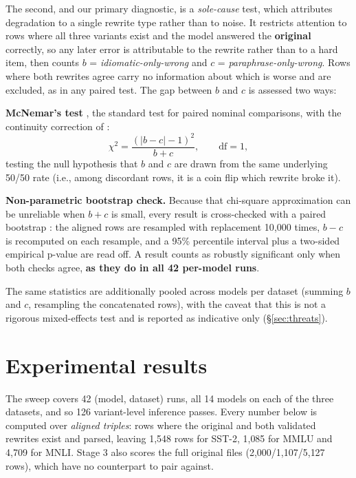 \documentclass{article}   %
\newcommand{\citetf}[1]{\citet{#1}}
\newcommand{\citepf}[1]{\citep{#1}}
\begin{document}
The second, and our primary diagnostic, is a \emph{sole-cause} test, which
attributes degradation to a single rewrite type rather than to noise. It
restricts attention to rows where all three variants exist and the model
answered the \textbf{original} correctly, so any later error is attributable to
the rewrite rather than to a hard item, then counts $b$ =
\emph{idiomatic-only-wrong} and $c$ = \emph{paraphrase-only-wrong}. Rows where
both rewrites agree carry no information about which is worse and are excluded,
as in any paired test. The gap between $b$ and $c$ is assessed two ways:

\textbf{McNemar's test} \citepf{mcnemar1947note}, the standard test for paired
nominal comparisons, with the continuity correction of \citetf{edwards1948note}:
\begin{equation}
  \chi^2 = \frac{(|b - c| - 1)^2}{b + c}, \qquad \mathrm{df} = 1,
\end{equation}
testing the null hypothesis that $b$ and $c$ are drawn from the same
underlying 50/50 rate (i.e., among discordant rows, it is a coin flip which
rewrite broke it).

\textbf{Non-parametric bootstrap check.} Because that chi-square approximation
can be unreliable when $b + c$ is small, every result is cross-checked with a
paired bootstrap \citepf{efron1993bootstrap}: the aligned rows are resampled
with replacement 10{,}000 times, $b - c$ is recomputed on each resample, and a
95\% percentile interval plus a two-sided empirical p-value are read off. A
result counts as robustly significant only when both checks agree, \textbf{as
they do in all 42 per-model runs}.

The same statistics are additionally pooled across models per dataset (summing
$b$ and $c$, resampling the concatenated rows), with the caveat that this is
not a rigorous mixed-effects test and is reported as indicative only
(\S\ref{sec:threats}).

\section{Experimental results}
\label{sec:results}

The sweep covers 42 (model, dataset) runs, all 14 models on each of the three
datasets, and so 126 variant-level inference passes. Every number below is
computed over \emph{aligned triples}: rows where the original and both
validated rewrites exist and parsed, leaving 1{,}548 rows for SST-2, 1{,}085
for MMLU and 4{,}709 for MNLI. Stage 3 also scores the full original files
(2{,}000/1{,}107/5{,}127 rows), which have no counterpart to pair against.
\end{document}
